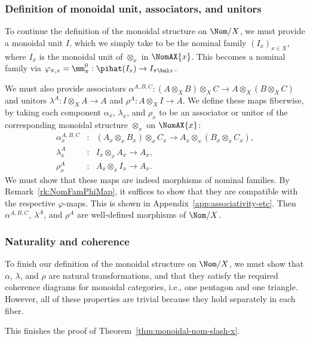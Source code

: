 \documentclass[twoside,11pt]{entics}
\begin{document}
\subsubsection{Definition of monoidal unit, associators, and unitors}
\label{sssec:def-unit-etc}

To continue the definition of the monoidal structure on $\Nom/X$, we
must provide a monoidal unit $I$, which we simply take to be the
nominal family $(I_x)_{x\in X}$, where $I_x$ is the monoidal unit of
$\otimes_x$ in $\NomAX{x}$. This becomes a nominal family via
$\varphi_{\pi,x} = \mm_{\pi}^0 : \pihat(I_x)\to I_{\pi\bul x}$.


We must also provide associators $\alpha^{A,B,C}:(A\otimes_X B)\otimes_X C\to
A\otimes_X(B\otimes_X C)$ and unitors $\lambda^{A}:I\otimes_X A\to A$ and $\rho^{A}:A\otimes_X
I\to A$.  We define these maps fiberwise, by taking each component
$\alpha_x$, $\lambda_x$, and $\rho_x$ to be an associator or unitor of
the corresponding monoidal structure $\otimes_x$ on $\NomAX{x}$:
\[
\begin{array}{lll}
  \alpha^{A,B,C}_{x} &:& (A_x\otimes_x B_x)\otimes_x C_x\to A_x\otimes_x(B_x\otimes_x C_x), \\
  \lambda^{A}_{x} &:& I_x\otimes_x A_x\to A_x,\\
  \rho^{A}_{x} &:& A_x\otimes_x I_x\to A_x.
\end{array}
\]
We must show that these maps are indeed morphisms of nominal
families. By Remark~\ref{rk:NomFamPhiMap}, it suffices to show that
they are compatible with the respective $\varphi$-maps.
This is shown in Appendix~\ref{app:associativity-etc}.
Then $\alpha^{A,B,C}$, $\lambda^{A}$, and
$\rho^{A}$ are well-defined morphisms of $\Nom/X$.

\subsubsection{Naturality and coherence}

To finish our definition of the monoidal structure on $\Nom/X$, we
must show that $\alpha$, $\lambda$, and $\rho$ are natural
transformations, and that they satisfy the required coherence diagrams
for monoidal categories, i.e., one pentagon and one triangle. However,
all of these properties are trivial because they hold separately in
each fiber.

This finishes the proof of Theorem~\ref{thm:monoidal-nom-slash-x}.
\end{document}
